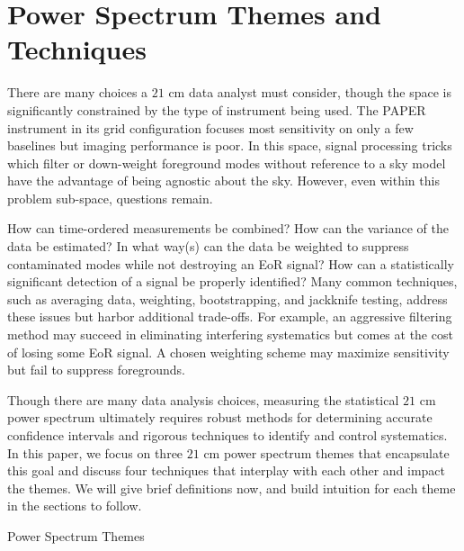 \documentclass[preprint2,numberedappendix,tighten]{aastex6}  %
\begin{document}

\section{Power Spectrum Themes and Techniques}
\label{sec:Themes}

There are many choices a $21$ cm data analyst must consider, though the space is significantly constrained by 
the type of instrument being used.  The PAPER instrument in its grid configuration focuses most sensitivity on 
only a few baselines but imaging performance is poor. In this space, signal processing tricks which filter or 
down-weight foreground modes without reference to a sky model have the advantage of being agnostic about 
the sky. However, even within this problem sub-space, questions remain.

 How can time-ordered measurements be combined? How can the 
variance of the data be estimated? In what way(s) can the data be weighted to suppress contaminated modes while not 
destroying an EoR signal? How can a statistically significant detection of a signal be properly identified? Many common techniques, such as 
averaging data, weighting, bootstrapping, and jackknife testing, address these issues but harbor additional trade-offs. For 
example, an aggressive filtering method may succeed in eliminating interfering systematics but comes at the cost of losing 
some EoR signal. A chosen weighting scheme may maximize sensitivity but fail to suppress foregrounds. 

Though there are many data analysis choices, measuring the statistical $21$ cm power spectrum ultimately requires robust 
methods for determining accurate confidence intervals and rigorous techniques to identify and control systematics.  In this 
paper, we focus on three $21$ cm power spectrum themes that encapsulate this goal and discuss four techniques that interplay 
with each other and impact the themes. We will give brief definitions now, and build intuition for each theme in the sections to 
follow.

\begin{center}
Power Spectrum Themes
\end{center}
\end{document}
